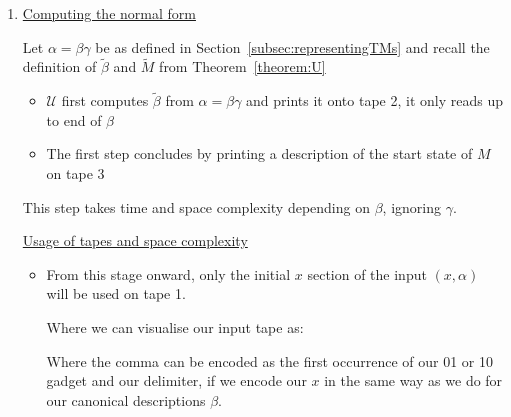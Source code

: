 \documentclass{article}
\begin{document}
\begin{enumerate}
  \item \underline{Computing the normal form}

        Let $\alpha = \beta\gamma$ be as defined in Section~\ref{subsec:representingTMs} and recall the definition of $\tilde{\beta}$ and $\tilde{M}$ from Theorem~\ref{theorem:U}

        \begin{itemize}
          \item $\mathcal{U}$ first computes $\tilde{\beta}$ from \(\alpha=\beta\gamma\) and prints it onto tape 2, it only reads up to end of \(\beta\)
          \item The first step concludes by printing a description of the start state of $M$ on tape 3
        \end{itemize}
        This step takes time and space complexity depending on \(\beta\), ignoring \(\gamma\).

        \underline{Usage of tapes and space complexity}
        \begin{itemize}
          \item From this stage onward, only the initial $x$ section of the input $(x,\alpha)$ will be used on tape 1.

                Where we can visualise our input tape as:

        \begin{center}
            \end{center}

                Where the comma can be encoded as the first occurrence of our 01 or 10 gadget and our delimiter, if we encode our $x$ in the same way as we do for our canonical descriptions \(\beta\).



\end{itemize}
\end{enumerate}
\end{document}

